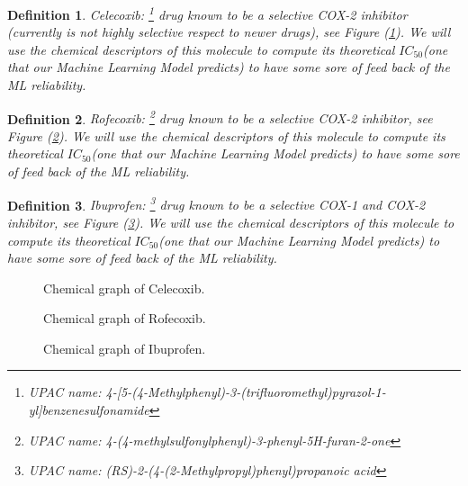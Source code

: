 \documentclass[12pt,letterpaper]{article}
\newtheorem{definition}{Definition}
\begin{document}
\begin{multicols}{2}
\begin{definition}
Celecoxib: \footnote{UPAC name: 4-[5-(4-Methylphenyl)-3-(trifluoromethyl)pyrazol-1-yl]benzenesulfonamide} drug known to be a selective COX-2 inhibitor (currently is not \emph{highly selective} respect to newer drugs), see Figure (\ref{CelecoxibFigure}). We will use the chemical descriptors of this molecule to compute its theoretical $IC_{50}$(one that our Machine Learning Model predicts) to have some sore of feed back of the ML reliability.
\end{definition}


\begin{definition}
Rofecoxib: \footnote{UPAC name: 4-(4-methylsulfonylphenyl)-3-phenyl-5H-furan-2-one} drug known to be a selective COX-2 inhibitor, see Figure (\ref{RofecoxibFigure}). We will use the chemical descriptors of this molecule to compute its theoretical $IC_{50}$(one that our Machine Learning Model predicts) to have some sore of feed back of the ML reliability.
\end{definition}

\begin{definition}
Ibuprofen: \footnote{UPAC name: (RS)-2-(4-(2-Methylpropyl)phenyl)propanoic acid} drug known to be a selective COX-1 and COX-2 inhibitor, see Figure (\ref{IbuprofenFigure}). We will use the chemical descriptors of this molecule to compute its theoretical $IC_{50}$(one that our Machine Learning Model predicts) to have some sore of feed back of the ML reliability.
\end{definition}

\begin{figure}[H]
\centering
{}
\caption{Chemical graph of Celecoxib.}
\label{CelecoxibFigure}
\end{figure}

\begin{figure}[H]
\centering
{}
\caption{Chemical graph of Rofecoxib.}
\label{RofecoxibFigure}
\end{figure}

\begin{figure}[H]
\centering
{}
\caption{Chemical graph of Ibuprofen.}
\label{IbuprofenFigure}


\end{figure}
\end{multicols}
\end{document}
